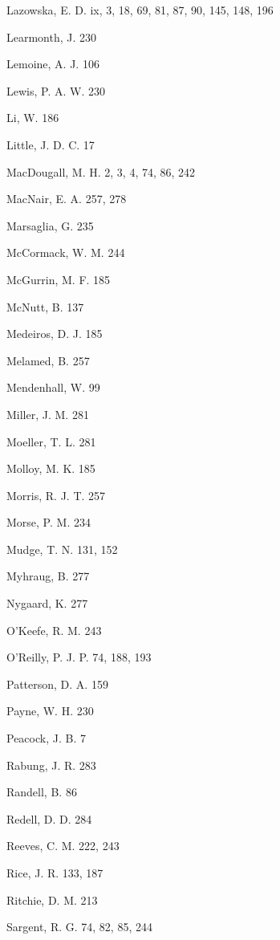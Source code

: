 \noindent Lazowska, E. D. ix, 3, 18, 69, 81, 87, 90, 145, 148, 196\par
\noindent Learmonth, J. 230\par
\noindent Lemoine, A. J. 106\par
\noindent Lewis, P. A. W. 230\par
\noindent Li, W. 186\par
\noindent Little, J. D. C. 17\par
\noindent MacDougall, M. H. 2, 3, 4, 74, 86, 242\par
\noindent MacNair, E. A. 257, 278\par
\noindent Marsaglia, G. 235\par
\noindent McCormack, W. M. 244\par
\noindent McGurrin, M. F. 185\par
\noindent McNutt, B. 137\par
\noindent Medeiros, D. J. 185\par
\noindent Melamed, B. 257\par
\noindent Mendenhall, W. 99\par
\noindent Miller, J. M. 281\par
\noindent Moeller, T. L. 281\par
\noindent Molloy, M. K. 185\par
\noindent Morris, R. J. T. 257\par
\noindent Morse, P. M. 234\par
\noindent Mudge, T. N. 131, 152\par
\noindent Myhraug, B. 277\par
\noindent Nygaard, K. 277\par
\noindent O'Keefe, R. M. 243\par
\noindent O'Reilly, P. J. P. 74, 188, 193\par
\noindent Patterson, D. A. 159\par
\noindent Payne, W. H. 230\par
\noindent Peacock, J. B. 7\par
\noindent Rabung, J. R. 283\par
\noindent Randell, B. 86\par
\noindent Redell, D. D. 284\par
\noindent Reeves, C. M. 222, 243\par
\noindent Rice, J. R. 133, 187\par
\noindent Ritchie, D. M. 213\par
\noindent Sargent, R. G. 74, 82, 85, 244\par
